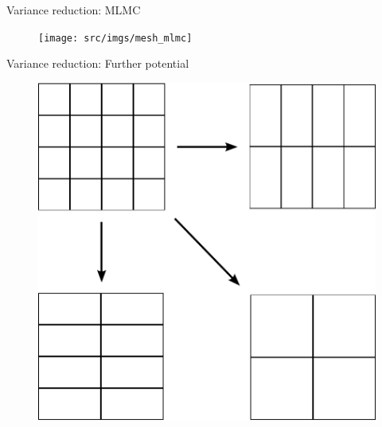 \begin{frame}{Variance reduction: MLMC}
  \begin{figure}
    \centering
    \texttt{[image: src/imgs/mesh\_mlmc]}
  \end{figure}
\end{frame}

\begin{frame}[noframenumbering]{Variance reduction: Further potential}
  \begin{figure}
    \centering
    \includegraphics[scale=0.43]{src/imgs/mesh_mimc}
  \end{figure}
\end{frame}

